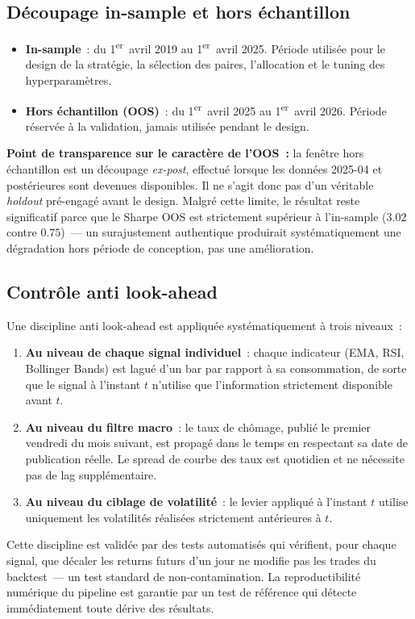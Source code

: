 \subsection{Découpage in-sample et hors échantillon}

\begin{itemize}
\item \textbf{In-sample}~: du 1\textsuperscript{er}~avril 2019 au 1\textsuperscript{er}~avril 2025. Période utilisée pour le design de la stratégie, la sélection des paires, l'allocation et le tuning des hyperparamètres.
\item \textbf{Hors échantillon (OOS)}~: du 1\textsuperscript{er}~avril 2025 au 1\textsuperscript{er}~avril 2026. Période réservée à la validation, jamais utilisée pendant le design.
\end{itemize}

\begin{warningbox}
\textbf{Point de transparence sur le caractère de l'OOS~:} la fenêtre hors échantillon est un découpage \emph{ex-post}, effectué lorsque les données 2025-04 et postérieures sont devenues disponibles. Il ne s'agit donc pas d'un véritable \emph{holdout} pré-engagé avant le design. Malgré cette limite, le résultat reste significatif parce que le Sharpe OOS est strictement supérieur à l'in-sample ($3.02$ contre $0.75$)~--- un surajustement authentique produirait systématiquement une dégradation hors période de conception, pas une amélioration.
\end{warningbox}

\subsection{Contrôle anti look-ahead}

Une discipline anti look-ahead est appliquée systématiquement à trois niveaux~:

\begin{enumerate}
\item \textbf{Au niveau de chaque signal individuel}~: chaque indicateur (EMA, RSI, Bollinger Bands) est lagué d'un bar par rapport à sa consommation, de sorte que le signal à l'instant $t$ n'utilise que l'information strictement disponible avant $t$.
\item \textbf{Au niveau du filtre macro}~: le taux de chômage, publié le premier vendredi du mois suivant, est propagé dans le temps en respectant sa date de publication réelle. Le spread de courbe des taux est quotidien et ne nécessite pas de lag supplémentaire.
\item \textbf{Au niveau du ciblage de volatilité}~: le levier appliqué à l'instant $t$ utilise uniquement les volatilités réalisées strictement antérieures à $t$.
\end{enumerate}

Cette discipline est validée par des tests automatisés qui vérifient, pour chaque signal, que décaler les returns futurs d'un jour ne modifie pas les trades du backtest~--- un test standard de non-contamination. La reproductibilité numérique du pipeline est garantie par un test de référence qui détecte immédiatement toute dérive des résultats.
